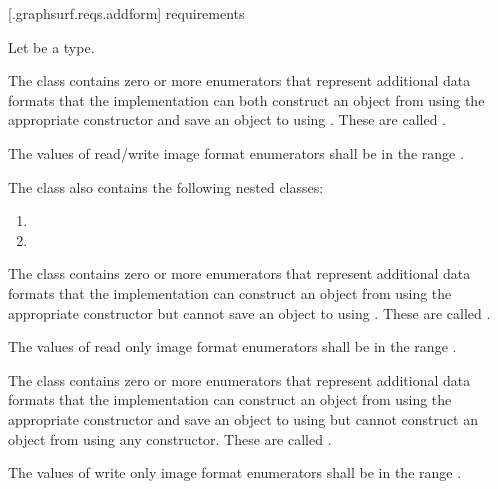  [\iotwod.graphsurf.reqs.addform]{ requirements}

\pnum
Let  be a \graphicssurfacestemplparam type.

\pnum
The  class contains zero or more  enumerators that represent  additional data formats that the implementation can both construct an  object from using the appropriate constructor and save an  object to using . These are called .

\pnum
The values of read/write image format enumerators shall be in the range .

\pnum
The  class also contains the following nested classes:

\begin{enumerate}
\item {}
\item {}
\end{enumerate}

\pnum
The  class contains zero or more  enumerators that represent  additional data formats that the implementation can construct an  object from using the appropriate constructor but cannot save an  object to using . These are called .

\pnum
The values of read only image format enumerators shall be in the range .

\pnum
The  class contains zero or more  enumerators that represent  additional data formats that the implementation can construct an  object from using the appropriate constructor and save an  object to using  but cannot construct an  object from using any constructor. These are called .

\pnum
The values of write only image format enumerators shall be in the range .

